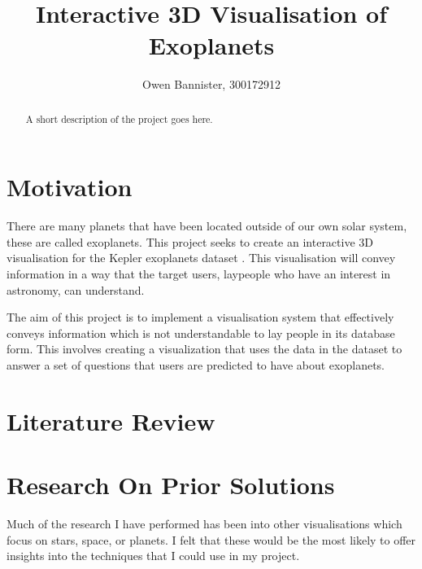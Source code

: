 \documentclass[11pt
              , a4paper
              , twoside
              , openright
              ]{report}
\title{Interactive 3D Visualisation of Exoplanets}
\author{Owen Bannister, 300172912}
\date{}
\begin{document}
\frontmatter



\begin{abstract}

A short description of the project goes here.

\end{abstract}


\maketitle



\tableofcontents



\mainmatter


\chapter{Motivation}
There are many planets that have been located outside of our own solar system, these are called exoplanets. This project seeks to create an interactive 3D visualisation for the Kepler exoplanets dataset \cite{dataset}.  This visualisation will convey information in a way that the target users, laypeople who have an interest in astronomy, can understand.

The aim of this project is to implement a visualisation system that effectively conveys information which is not understandable to lay people in its database form. This involves creating a visualization that uses the data in the dataset to answer a set of questions that users are predicted to have about exoplanets.

\chapter{Literature Review}
\chapter{Research On Prior Solutions}
Much of the research I have performed has been into other visualisations which focus on stars, space, or planets. I felt that these would be the most likely to offer insights into the techniques that I could use in my project.
\end{document}
